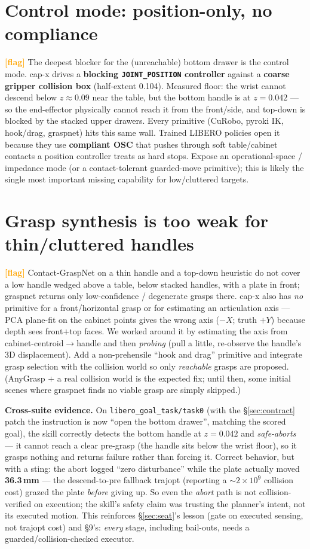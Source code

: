 \documentclass[11pt]{article}
\newcommand{\flag}{\textcolor{orange}{\textbf{[flag]}}}
\newcommand{\code}[1]{\texttt{#1}}
\begin{document}
\section{Control mode: position-only, no compliance}
\flag{} The deepest blocker for the (unreachable) bottom drawer is the control mode. cap-x
drives a \textbf{blocking \code{JOINT\_POSITION} controller} against a \textbf{coarse gripper
collision box} (half-extent 0.104). Measured floor: the wrist cannot descend below
$z\!\approx\!0.09$ near the table, but the bottom handle is at $z = 0.042$ --- so the
end-effector physically cannot reach it from the front/side, and top-down is blocked by the
stacked upper drawers. Every primitive (CuRobo, pyroki IK, hook/drag, graspnet) hits this
same wall. Trained LIBERO policies open it because they use \textbf{compliant OSC} that
pushes through soft table/cabinet contacts a position controller treats as hard stops.
Expose an operational-space / impedance mode (or a contact-tolerant guarded-move primitive);
this is likely the single most important missing capability for low/cluttered targets.

\section{Grasp synthesis is too weak for thin/cluttered handles}
\flag{} Contact-GraspNet on a thin handle and a top-down heuristic do not cover a low handle
wedged above a table, below stacked handles, with a plate in front; graspnet returns only
low-confidence / degenerate grasps there. cap-x also has \emph{no} primitive for a
front/horizontal grasp or for estimating an articulation axis --- PCA plane-fit on the
cabinet points gives the wrong axis ($-X$; truth $+Y$) because depth sees front$+$top faces.
We worked around it by estimating the axis from cabinet-centroid$\to$handle and then
\emph{probing} (pull a little, re-observe the handle's 3D displacement). Add a non-prehensile
``hook and drag'' primitive and integrate grasp selection with the collision world so only
\emph{reachable} grasps are proposed. (AnyGrasp $+$ a real collision world is the expected
fix; until then, some initial scenes where graspnet finds no viable grasp are simply skipped.)

\medskip\noindent\textbf{Cross-suite evidence.} On \code{libero\_goal\_task/task0} (with the
\S\ref{sec:contract} patch the instruction is now ``open the bottom drawer'', matching the
scored goal), the skill correctly detects the bottom handle at $z = 0.042$ and
\emph{safe-aborts} --- it cannot reach a clear pre-grasp (the handle sits below the wrist
floor), so it grasps nothing and returns failure rather than forcing it. Correct behavior,
but with a sting: the abort logged ``zero disturbance'' while the plate actually moved
\textbf{36.3\,mm} --- the descend-to-pre fallback trajopt (reporting a $\sim$$2\times10^{9}$
collision cost) grazed the plate \emph{before} giving up. So even the \emph{abort} path is
not collision-verified on execution; the skill's safety claim was trusting the planner's
intent, not its executed motion. This reinforces \S\ref{sec:seat}'s lesson (gate on executed
sensing, not trajopt cost) and \S9's: \emph{every} stage, including bail-outs, needs a
guarded/collision-checked executor.
\end{document}
